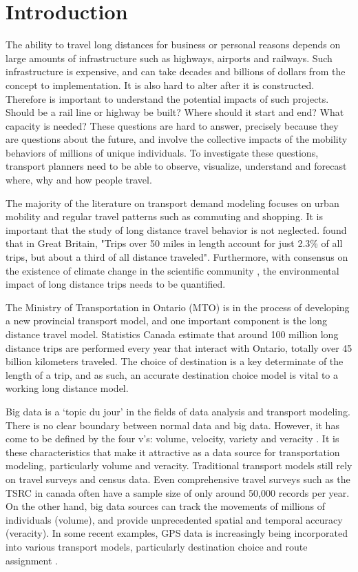 \chapter{Introduction}
The ability to travel long distances for business or personal reasons depends on large amounts of infrastructure such as highways, airports and railways. Such infrastructure is expensive, and can take decades and billions of dollars from the concept to implementation. It is also hard to alter after it is constructed. Therefore is important to understand the potential impacts of such projects. Should be a rail line or highway be built? Where should it start and end? What capacity is needed? These questions are hard to answer, precisely because they are questions about the future, and involve the collective impacts of the mobility behaviors of millions of unique individuals. To investigate these questions, transport planners need to be able to observe, visualize, understand and forecast where, why and how people travel. 

The majority of the literature on transport demand modeling focuses on urban mobility and regular travel patterns such as commuting and shopping. It is important that the study of long distance travel behavior is not neglected. \textcite{rohr2010modelling} found that in Great Britain, "Trips over 50 miles in length account for just 2.3\% of all trips, but about a third of all distance traveled". Furthermore, with  consensus on the existence of climate change in the scientific community \parencite{oreskes2004scientific}, the environmental impact of long distance trips needs to be quantified.

The Ministry of Transportation in Ontario (MTO) is in the process of developing a new provincial transport model, and one important component is the long distance travel model. Statistics Canada estimate that around 100 million long distance trips are performed every year that interact with Ontario, totally over 45 billion kilometers traveled. The choice of destination is a key determinate of the length of a trip, and as such, an accurate destination choice model is vital to a working long distance model. 

Big data is a `topic du jour' in the fields of data analysis and transport modeling. There is no clear boundary between normal data and big data. However, it has come to be defined by the four v's: volume, velocity, variety and veracity \parencite{beyer2012importance}. It is these characteristics that make it attractive as a data source for transportation modeling, particularly volume and veracity. Traditional transport models still rely on travel surveys and census data. Even comprehensive travel surveys such as the TSRC in canada  often have a sample size of only around 50,000 records per year. On the other hand, big data sources can track the movements of millions of individuals (volume), and provide unprecedented spatial and temporal accuracy (veracity). In some recent examples, GPS data is increasingly being incorporated into various transport models, particularly destination choice \parencite{schonfelder2006analysis, pan2006cellular} and route assignment \parencite{broach2012cyclists, menghini2010route}.

